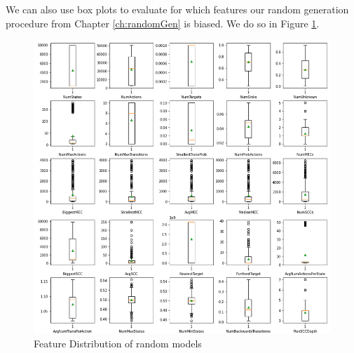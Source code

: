 We can also use box plots to evaluate for which features our random generation procedure from Chapter \ref{ch:randomGen} is biased.
We do so in Figure \ref{fig:Random_FeatureDistribution}.
\begin{figure}[t]
    \centering
    \includegraphics[width=1\textwidth]{figures/RandomRandom_FeatureDistribution.png}
    \caption[Feature Distribution of random models]{
        Feature Distribution of random models
    }
    \label{fig:Random_FeatureDistribution}
\end{figure}

